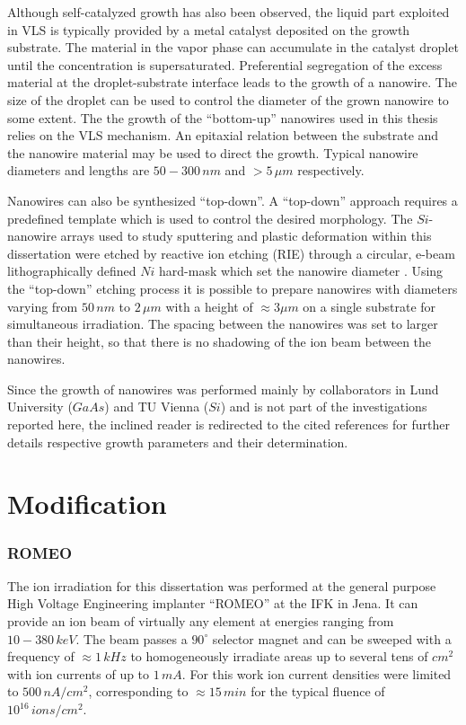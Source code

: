 Although self-catalyzed growth has also been observed, the liquid part exploited in VLS is typically provided by a metal catalyst deposited on the growth substrate. The material in the vapor phase can accumulate in the catalyst droplet until the concentration is supersaturated. Preferential segregation of the excess material at the droplet-substrate interface leads to the growth of a nanowire. The size of the droplet can be used to control the diameter of the grown nanowire to some extent. The the growth of the ``bottom-up'' nanowires used in this thesis relies on the VLS mechanism. An epitaxial relation between the substrate and the nanowire material may be used to direct the growth. Typical nanowire diameters and lengths are $50 - 300\,nm$ and $> 5\,\mu m$ respectively.

Nanowires can also be synthesized ``top-down''. A ``top-down'' approach requires a predefined template which is used to control the desired morphology. The $Si$-nanowire arrays used to study sputtering and plastic deformation within this dissertation were etched by reactive ion etching (RIE) through a circular, e-beam lithographically defined $Ni$ hard-mask which set the nanowire diameter \cite{johannes_anomalous_2015}. Using the ``top-down'' etching process it is possible to prepare nanowires with diameters varying from $50\,nm$ to $2\,\mu m$ with a height of $\approx 3\mu m$ on a single substrate for simultaneous irradiation. The spacing between the nanowires was set to larger than their height, so that there is no shadowing of the ion beam between the nanowires.

Since the growth of nanowires was performed mainly by collaborators in Lund University ($GaAs$) and TU Vienna ($Si$) and is not part of the investigations reported here, the inclined reader is redirected to the cited references for further details respective growth parameters and their determination.

\section{Modification}


\subsubsection{ROMEO}


The ion irradiation for this dissertation was performed at the general purpose High Voltage Engineering implanter ``ROMEO'' at the IFK in Jena. It can provide an ion beam of virtually any element at energies ranging from $10-380\,keV$. The beam passes a $90^\circ$ selector magnet and can be sweeped with a frequency of $\approx 1\,kHz$ to homogeneously irradiate areas up to several tens of $cm^2$ with ion currents of up to $1\,mA$. For this work ion current densities were limited to $500\,nA/cm^2$, corresponding to $\approx 15\,min$ for the typical fluence of $10^{16}\,ions/cm^2$.

